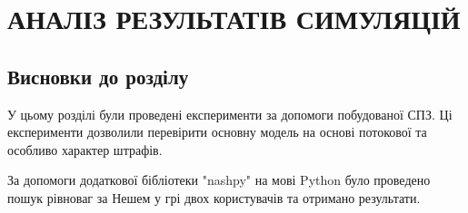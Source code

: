 
\chapter{АНАЛІЗ РЕЗУЛЬТАТІВ СИМУЛЯЦІЙ}





\section*{Висновки до розділу}

У цьому розділі були проведені експерименти за допомоги побудованої СПЗ. Ці експерименти дозволили перевірити основну модель на основі потокової та особливо характер штрафів.

За допомоги додаткової бібліотеки "nashpy" на мові Python було проведено пошук рівноваг за Нешем у грі двох користувачів та отримано результати.